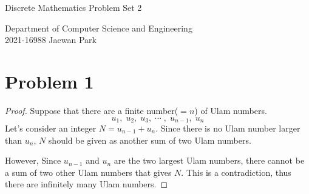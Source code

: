 \documentclass[10pt]{article}
\begin{document}
\vspace{4mm}
\begin{center}
    {\LARGE Discrete Mathematics Problem Set 2} \\
\end{center}
\begin{flushright}
    Department of Computer Science and Engineering \\
    2021-16988 Jaewan Park
\end{flushright}

\section*{Problem 1}
\begin{proof}
    Suppose that there are a finite number($=n$) of Ulam numbers. 
    $$u_1, \; u_2, \; u_3, \; \cdots \;, \; u_{n-1}, \; u_n$$
    Let's consider an integer $N = u_{n-1} + u_n$. 
    Since there is no Ulam number larger than $u_n$, $N$ should be given as another sum of two Ulam numbers.

    \vspace{0.3cm} However, Since $u_{n-1}$ and $u_n$ are the two largest Ulam numbers, there cannot be a sum of two other Ulam numbers that gives $N$. 
    This is a contradiction, thus there are infinitely many Ulam numbers.

\end{proof}
\end{document}
